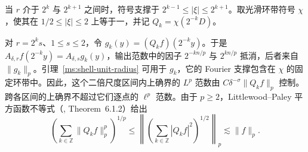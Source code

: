 当 $r$ 介于 $2^k$ 与 $2^{k+1}$ 之间时，符号支撑于 $2^{k-1}\le|\xi|\le2^{k+1}$。取光滑环带符号 $\chi$，使其在 $1/2\le|\xi|\le2$ 上等于一，并记 $Q_k=\chi(2^{-k}D)$。

对 $r=2^ks$、$1\le s\le2$，令 $g_k(y)=(Q_k f)(2^{-k}y)$。于是 $A_{\delta,r}f(2^{-k}y)=A_{\delta,s}g_k(y)$，输出范数中的因子 $2^{-kn/p}$ 与 $2^{kn/p}$ 抵消，后者来自 $\|g_k\|_p$。引理~\ref{ms:shell-unit-radius} 可用于 $g_k$，它的 Fourier 支撑包含在 $\chi$ 的固定环带中。因此，这个二倍尺度区间内上确界的 $L^p$ 范数由 $C\delta^{-\sigma}\|Q_k f\|_p$ 控制。跨各区间的上确界不超过它们逐点的 $\ell^p$ 范数。由于 $p\ge2$，Littlewood--Paley 平方函数不等式（\cite{r-32}, Theorem~6.1.2）给出
\[
 \left(\sum_{k\in\mathbb Z}\|Q_k f\|_p^p\right)^{1/p}
 \le\left\|\left(\sum_{k\in\mathbb Z}|Q_k f|^2\right)^{1/2}\right\|_p
 \lesssim\|f\|_p.
\]

